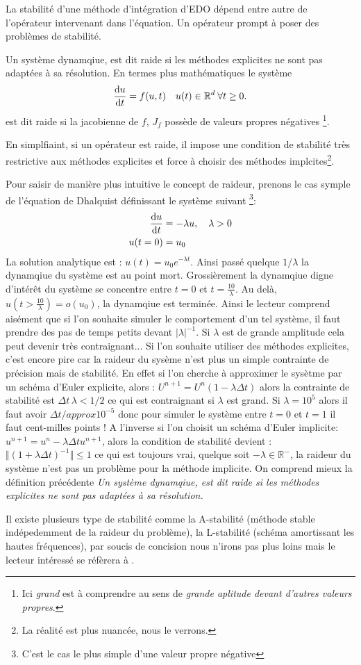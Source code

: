 La stabilité d'une méthode d'intégration d'EDO dépend entre autre de l'opérateur intervenant dans l'équation.
Un opérateur prompt à poser des problèmes de stabilité.
\begin{definition}
    Un système dynamqiue, est dit raide si les méthodes explicites ne sont pas adaptées à sa résolution.
    En termes plus mathématiques le système 
    \begin{align}
    \frac{\text d u}{\text{d}t} = f(u,t) \quad u(t) \in \mathbb{R}^d \: \forall t\geq 0.
    \end{align}
    est dit raide si la jacobienne de $f$, $J_f$ possède de  valeurs propres négatives
    \footnote{Ici \textit{grand} est à comprendre au sens de \textit{grande aplitude devant d'autres valeurs propres}.}.
\end{definition}
En simplfiaint, si un opérateur est raide, il impose une condition de stabilité très restrictive aux méthodes explicites et 
force à choisir des méthodes implcites\footnote{La réalité est plus nuancée, nous le verrons.}.
\begin{exemple}
    Pour saisir de manière plus intuitive le concept de raideur, prenons le cas symple de l'équation de Dhalquist définissant le système suivant
    \footnote{C'est le cas le plus simple d'une valeur propre négative}:
    \begin{align}
        \frac{\text d u }{\text d t} &= - \lambda u,\quad \lambda > 0\\\notag
        u(t=0)&=u_0
    \end{align}
    La solution analytique est : $u(t) = u_0 e^{-\lambda t}$. Ainsi passé quelque $ 1/\lambda$ la dynamqiue du système est au point mort. 
    Grossièrement la dynamqiue digne d'intérêt du système se concentre entre $t=0$ et $t=\frac{10}{\lambda}$. 
    Au delà, $u(t>\frac{10}{\lambda}) = o(u_0)$, la dynamqiue est terminée.
    Ainsi le lecteur comprend aisément que si l'on souhaite simuler le comportement d'un tel système, il faut prendre des pas de temps petits devant $\vert \lambda \vert^{-1}$.
    Si $\lambda$ est de grande amplitude cela peut devenir très contraignant... Si l'on souhaite utiliser des méthodes explicites, c'est encore pire car la raideur du sysème 
    n'est plus un simple contrainte de précision mais de stabilité. En effet si l'on cherche à approximer le sysètme par un schéma d'Euler explicite, alors : 
    $U^{n+1} = U^n (1 - \lambda \Delta t)$ alors la contrainte de stabilité est $\Delta t \, \lambda < 1/2$ ce qui est contraignant si $\lambda$ est grand. 
    Si $\lambda = 10^5$ alors il faut avoir $\Delta t /approx 10^{-5}$ donc pour simuler le système entre $t=0$ et $t=1$ il faut cent-milles points !
    A l'inverse si l'on choisit un schéma d'Euler implicite: $u^{n+1} = u^n - \lambda \Delta t u^{n+1}$, alors la condition de stabilité devient : 
    $\Vert(1+\lambda \Delta t)^{-1}\Vert \leq 1$ ce qui est toujours vrai, quelque soit $- \lambda \in \mathbb{R}^-$, la raideur du système n'est pas un problème pour la méthode implicite.
    On comprend mieux la définition précédente \textit{Un système dynamqiue, est dit raide si les méthodes explicites ne sont pas adaptées à sa résolution.}
\end{exemple}
Il existe plusieurs type de stabilité comme la A-stabilité (méthode stable indépedemment de la raideur du problème), la L-stabilité (schéma amortissant les hautes fréquences),
par soucis de concision nous n'irons pas plus loins mais le lecteur intéressé se réfèrera à \cite{HairerAndWanner1}.